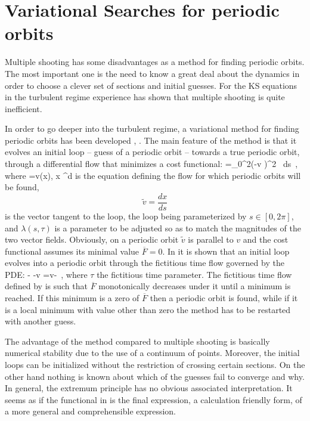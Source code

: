 \documentclass[pre,preprint,groupedaddress,showpacs,showkeys]{revtex4}
\begin{document}
\section{Variational Searches for periodic orbits}

Multiple shooting has some disadvantages as a method for finding
periodic orbits. The most important one is the need to know a
great deal about the dynamics in order to choose a clever set of
\Poincare sections and initial guesses. For the KS equations in
the turbulent regime experience \cite{Lan:Thesis} has shown that
multiple shooting is quite inefficient.

In order to go deeper into the turbulent regime, a variational
method for finding periodic orbits has been developed \cite{CvitLanCrete02}, \cite{lanVar1}.
The main feature of the method is that it evolves an initial loop -- guess of a periodic orbit -- towards
a true periodic orbit, through a differential flow that minimizes a cost functional:
\beq
    =\int_0^{2\pi}\left(-\lambda v \right)^2 \, ds \,,
    \label{eq:functional}
\eeq
where
\beq
    =v(x),\; x \in {}^d
    \label{eq:flow}
\eeq
is the equation defining the flow for which periodic orbits will be found,
\[
    \tilde{v}=\frac{d x}{d s}
\]
is the vector tangent to the loop, the loop being parameterized by $s \in [0,2\pi]$, and $\lambda(s,\tau)$
is a parameter to be adjusted so as to match the magnitudes of the two vector fields. Obviously,
on a periodic orbit $\tilde{v}$ is parallel to $v$ and the cost functional assumes its minimal value
$\overline{F}=0$. In \cite{CvitLanCrete02} it is shown that an initial loop evolves into a periodic
orbit through the fictitious time flow governed by the PDE:
\beq
    -\lambda {}
    -v\frac{\partial \lambda}{\partial \tau}
    =\lambda v- \,,
    \label{eq:varpde}
\eeq
where $\tau$ the fictitious time parameter. The fictitious time flow defined by  is such
that $\overline{F}$ monotonically decreases under it until a minimum is reached. If this minimum is
a zero of $\overline{F}$ then a periodic orbit is found, while if it is a local minimum with value
other than zero the method has to be restarted with another guess.

The advantage of the method compared to multiple shooting is basically numerical stability
due to the use of a continuum of points. Moreover, the initial loops can be initialized
without the restriction of crossing certain \Poincare sections. On the other hand nothing is known
about which of the guesses fail to converge and why. In general, the extremum principle has
no obvious associated interpretation. It seems as if the functional in  is the
final expression, a  calculation friendly form, of a more general and comprehensible expression.
\end{document}
